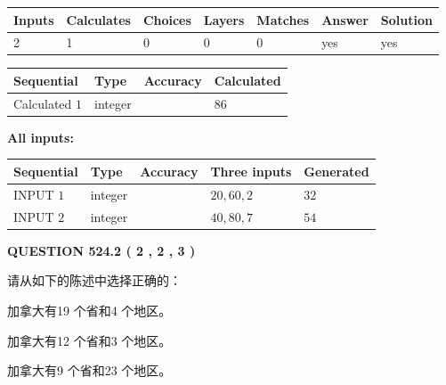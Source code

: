 \documentclass{ctexart}
\begin{document}
   
\noindent\begin{tabular}{|l|l|l|l|l|l|l|}
 \hline
Inputs & Calculates & Choices & Layers & Matches & Answer & Solution \\ \hline
 2  & 
 1  & 
 0
  & 
 0  & 
 0  & 
  yes & 
  yes 
  \\ \hline
 \end{tabular}
   
   
   
   
\noindent{}
   
   
  
  
\noindent\begin{tabular}{|l|l|l|l|}
\hline
 Sequential & Type & Accuracy & Calculated \\ 
\hline
 
 
  Calculated $  1 $ & integer &  & 
  $ 86 $ 
 \\  \hline  
 \end{tabular}
   
   
   
   
\noindent\vspace{0.1in}\hspace{-0.08in} {\textbf{\Large{All inputs: }}}
   
   
  
  
\noindent\begin{tabular}{|l|l|l|l|l|}
\hline
 Sequential & Type & Accuracy & Three inputs & Generated \\ 
\hline
 
 
  INPUT $  1 $ & integer &  & $
 20
 , 
 60
 , 
 2
 $ & $ 32 $ 
 \\  \hline  
 
 
  INPUT $  2 $ & integer &  & $
 40
 , 
 80
 , 
 7
 $ & $ 54 $ 
 \\  \hline  
 \end{tabular}
   
   
  
\vspace{0.2in}
  
{\textbf{\Large{QUESTION
524.2 
 ( 2 , 2 , 3 )
}}}
  
  
请从如下的陈述中选择正确的：
 
 
加拿大有19 个省和4 个地区。
 
 
加拿大有12 个省和3 个地区。
 
 
加拿大有9 个省和23 个地区。
 
\end{document}
